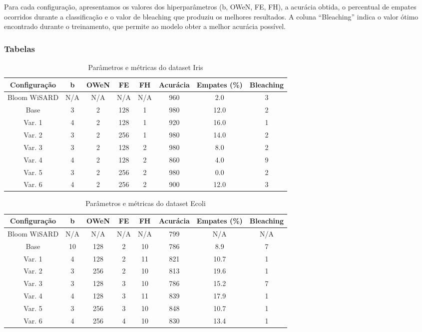 \documentclass{article}
\begin{document}
Para cada configuração, apresentamos os valores dos hiperparâmetros (b, OWeN, FE, FH), a acurácia obtida, o percentual de empates ocorridos durante a classificação e o valor de bleaching que produziu os melhores resultados. A coluna ``Bleaching'' indica o valor ótimo encontrado durante o treinamento, que permite ao modelo obter a melhor acurácia possível.

\subsubsection{Tabelas}

{\small
\begin{table}[h!]
\caption{Parâmetros e métricas do dataset Iris}
\begin{tabular}{|c|c|c|c|c|c|c|c|}
\hline
\textbf{Configuração} & \textbf{b} & \textbf{OWeN} & \textbf{FE} & \textbf{FH} & \textbf{Acurácia} & \textbf{Empates (\%)} & \textbf{Bleaching} \\
\hline
Bloom WiSARD & N/A & N/A & N/A & N/A & 960 & 2.0 & 3 \\
\hline
Base & 3 & 2 & 128 & 1 & 980 & 12.0 & 2 \\
\hline
Var. 1 & 4 & 2 & 128 & 1 & 920 & 16.0 & 1 \\
\hline
Var. 2 & 3 & 2 & 256 & 1 & 980 & 14.0 & 2 \\
\hline
Var. 3 & 3 & 2 & 128 & 2 & 980 & 8.0 & 2 \\
\hline
Var. 4 & 4 & 2 & 128 & 2 & 860 & 4.0 & 9 \\
\hline
Var. 5 & 3 & 2 & 256 & 2 & 980 & 0.0 & 2 \\
\hline
Var. 6 & 4 & 2 & 256 & 2 & 900 & 12.0 & 3 \\
\hline
\end{tabular}
\end{table}

\begin{table}[h!]
\caption{Parâmetros e métricas do dataset Ecoli}
\begin{tabular}{|c|c|c|c|c|c|c|c|}
\hline
\textbf{Configuração} & \textbf{b} & \textbf{OWeN} & \textbf{FE} & \textbf{FH} & \textbf{Acurácia} & \textbf{Empates (\%)} & \textbf{Bleaching} \\
\hline
Bloom WiSARD & N/A & N/A & N/A & N/A & 799 & N/A & N/A \\
\hline
Base & 10 & 128 & 2 & 10 & 786 & 8.9 & 7 \\
\hline
Var. 1 & 4 & 128 & 2 & 11 & 821 & 10.7 & 1 \\
\hline
Var. 2 & 3 & 256 & 2 & 10 & 813 & 19.6 & 1 \\
\hline
Var. 3 & 3 & 128 & 3 & 10 & 786 & 15.2 & 7 \\
\hline
Var. 4 & 4 & 128 & 3 & 11 & 839 & 17.9 & 1 \\
\hline
Var. 5 & 3 & 256 & 3 & 10 & 848 & 10.7 & 1 \\
\hline
Var. 6 & 4 & 256 & 4 & 10 & 830 & 13.4 & 1 \\
\hline
\end{tabular}
\end{table}

}
\end{document}
